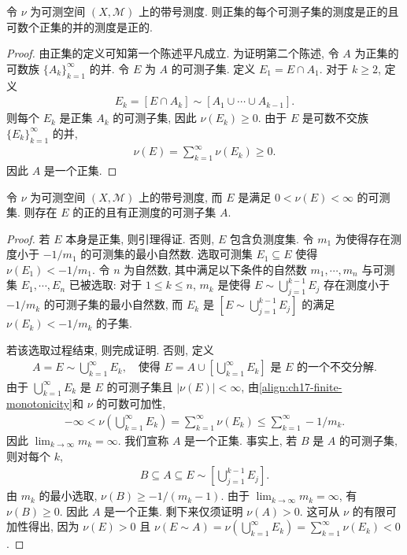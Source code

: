 \documentclass[../../main.tex]{subfiles}
\begin{document}
\begin{proposition}\label{proposition:ch17-positive-set}
令 $\nu$ 为可测空间 $(X,\mathcal{M})$ 上的带号测度. 则正集的每个可测子集的测度是正的且可数个正集的并的测度是正的.
\end{proposition}

\begin{proof}
由正集的定义可知第一个陈述平凡成立. 为证明第二个陈述, 令 $A$ 为正集的可数族 $\{A_{k}\}_{k=1}^{\infty}$ 的并. 令 $E$ 为 $A$ 的可测子集. 定义 $E_{1}=E\cap A_{1}$. 对于 $k\geqslant 2$, 定义
\begin{align*}
E_{k}=[E\cap A_{k}]\sim[A_{1}\cup\cdots\cup A_{k-1}].
\end{align*}
则每个 $E_{k}$ 是正集 $A_{k}$ 的可测子集, 因此 $\nu(E_{k})\geqslant 0$. 由于 $E$ 是可数不交族 $\{E_{k}\}_{k=1}^{\infty}$ 的并,
\begin{align*}
\nu(E)=\sum_{k=1}^{\infty}\nu(E_{k})\geqslant 0.
\end{align*}
因此 $A$ 是一个正集.
\end{proof}

\begin{lemma}[Hahn 引理]\label{lemma:ch17-hahn}
令 $\nu$ 为可测空间 $(X,\mathcal{M})$ 上的带号测度, 而 $E$ 是满足 $0<\nu(E)<\infty$ 的可测集. 则存在 $E$ 的正的且有正测度的可测子集 $A$.
\end{lemma}

\begin{proof}
若 $E$ 本身是正集, 则引理得证. 否则, $E$ 包含负测度集. 令 $m_{1}$ 为使得存在测度小于 $-1/m_{1}$ 的可测集的最小自然数. 选取可测集 $E_{1}\subseteq E$ 使得 $\nu(E_{1})<-1/m_{1}$. 令 $n$ 为自然数, 其中满足以下条件的自然数 $m_{1},\cdots,m_{n}$ 与可测集 $E_{1},\cdots,E_{n}$ 已被选取: 对于 $1\leqslant k\leqslant n$, $m_{k}$ 是使得 $E\sim\bigcup_{j=1}^{k-1}E_{j}$ 存在测度小于 $-1/m_{k}$ 的可测子集的最小自然数, 而 $E_{k}$ 是 $\left[E\sim\bigcup_{j=1}^{k-1}E_{j}\right]$ 的满足 $\nu(E_{k})<-1/m_{k}$ 的子集.

若该选取过程结束, 则完成证明. 否则, 定义
\begin{align*}
A=E\sim\bigcup_{k=1}^{\infty}E_{k},\quad\text{使得 }E=A\cup\left[\bigcup_{k=1}^{\infty}E_{k}\right]\text{ 是 }E\text{ 的一个不交分解}.
\end{align*}
由于 $\bigcup_{k=1}^{\infty}E_{k}$ 是 $E$ 的可测子集且 $|\nu(E)|<\infty$, 由\eqref{align:ch17-finite-monotonicity}和 $\nu$ 的可数可加性,
\begin{align*}
-\infty<\nu\left(\bigcup_{k=1}^{\infty}E_{k}\right)=\sum_{k=1}^{\infty}\nu(E_{k})\leqslant\sum_{k=1}^{\infty}-1/m_{k}.
\end{align*}
因此 $\lim_{k\to\infty}m_{k}=\infty$. 我们宣称 $A$ 是一个正集. 事实上, 若 $B$ 是 $A$ 的可测子集, 则对每个 $k$,
\begin{align*}
B\subseteq A\subseteq E\sim\left[\bigcup_{j=1}^{k-1}E_{j}\right].
\end{align*}
由 $m_{k}$ 的最小选取, $\nu(B)\geqslant-1/(m_{k}-1)$. 由于 $\lim_{k\to\infty}m_{k}=\infty$, 有 $\nu(B)\geqslant 0$. 因此 $A$ 是一个正集. 剩下来仅须证明 $\nu(A)>0$. 这可从 $\nu$ 的有限可加性得出, 因为 $\nu(E)>0$ 且 $\nu(E\sim A)=\nu\left(\bigcup_{k=1}^{\infty}E_{k}\right)=\sum_{k=1}^{\infty}\nu(E_{k})<0$.
\end{proof}
\end{document}
